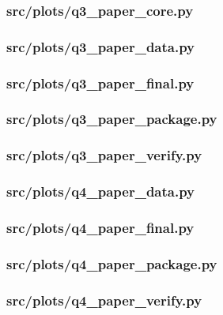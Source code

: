 \documentclass[zihao=-4,a4paper,UTF8,fontset=none]{ctexart}
\begin{document}
\subsubsection*{src/plots/q3\_paper\_core.py}


\subsubsection*{src/plots/q3\_paper\_data.py}


\subsubsection*{src/plots/q3\_paper\_final.py}


\subsubsection*{src/plots/q3\_paper\_package.py}


\subsubsection*{src/plots/q3\_paper\_verify.py}


\subsubsection*{src/plots/q4\_paper\_data.py}


\subsubsection*{src/plots/q4\_paper\_final.py}


\subsubsection*{src/plots/q4\_paper\_package.py}


\subsubsection*{src/plots/q4\_paper\_verify.py}

\end{document}
